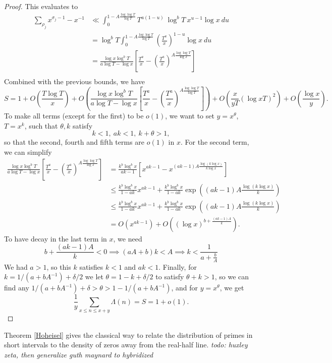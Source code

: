 \begin{proof}
    This evaluates to 
    \begin{align*}
        \sum_{\rho_j} x^{\sigma_j-1} - x^{-1} & \ll \int_0^{1-A\frac{\log \log T}{\log T}} T^{a(1-u)} \ \log^b T \  x^{u-1} \log x \ du\\
        &= \log^b T \int_0^{1-A\frac{\log \log T}{\log T}} \left(\frac{T^{a}}{x}\right)^{1-u} \log x \ du\\
        &= \frac{\log x \log^{b} T}{a \log T - \log x } \left[\frac{T^a}{x}-\left(\frac{T^a}{x}\right)^{A\frac{\log \log T}{\log T}}\right]\\
    \end{align*}
    Combined with the previous bounds, we have \[
        S=1 + O\left(\frac{T\log T}{x}\right)+ O\left( \frac{\log x \log^{b} T}{a \log T - \log x } \left[\frac{T^a}{x}-\left(\frac{T^a}{x}\right)^{A\frac{\log \log T}{\log T}}\right]\right)+ O(\frac{x}{yT}(\log xT) ^2) + O(\frac{\log x}{y}) . 
    \]
    To make all terms (except for the first) to be $o(1)$, we want to set 
    $y=x^\theta$, $T=x^k$, such that $\theta,k$ satisfy \[
        k<1,\ ak<1, \ k+\theta>1, 
    \]
    so that the second, fourth and fifth terms are $o(1)$ in $x$.
    For the second term, we can simplify \begin{align*}
        \frac{\log x \log^{b} T}{a \log T - \log x } \left[\frac{T^a}{x}-\left(\frac{T^a}{x}\right)^{A\frac{\log \log T}{\log T}}\right]
        &= \frac{k^b \log^{b}x}{ak-1}  \left[x^{ak-1}-x^{(ak-1)A\frac{\log (k \log x)}{k \log x}}\right]
        \\ &\leq \frac{k^b \log^{b}x}{1-ak} x^{ak-1}  + \frac{k^b \log^{b}x}{1-ak} \exp\left((ak-1)A\frac{\log (k \log x)}{k} \right)\\
        &\leq \frac{k^b \log^{b}x}{1-ak} x^{ak-1}  + \frac{k^b \log^{b}x}{1-ak} \exp\left((ak-1)A\frac{\log (k \log x)}{k} \right)\\
        & =O(x^{ak-1})+O\left(\left(\log  x\right)^{b+\frac{(ak-1)A}{k}}\right).
    \end{align*}
    To have decay in the last term in $x$, we need \[
        b+\frac{(ak-1)A}{k}< 0 \implies (aA+b)k<A \implies k < \frac{1}{a+\frac{b}{A}}
    \]
    We had $a>1$, so this $k$ satisfies $k<1$ and $ak<1$.
    Finally, for $k={1}/({a+bA^{-1}})+ \delta/2$ we let $\theta = 1-k+\delta/2$ to satisfy $\theta+k>1$,
    so we can find any ${1}/({a+bA^{-1}})+\delta >\theta>1-{1}/({a+bA^{-1}})$, and for $y=x^\theta$, we get\[
        \frac{1}{y}\sum_{x\leq n \leq x+y} \Lambda(n) = S = 1+o(1).
    \]

\end{proof}
Theorem \ref{Hoheisel} gives the classical way to relate the distribution of primes in short intervals to the density of zeros away from the real-half line.
\textit{todo: huxley zeta, then generalize guth maynard to hybridized} 